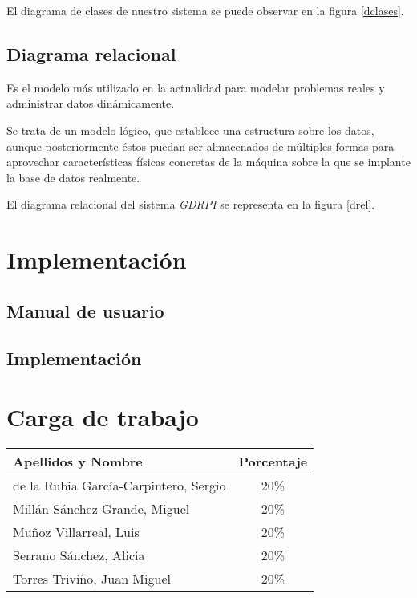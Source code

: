 \documentclass[11pt,a4paper,spanish,twoside]{book}
\begin{document}
El diagrama de clases de nuestro sistema se puede observar en la figura
\ref{dclases}.

\begin{sidewaystable}
\end{sidewaystable}

\section{Diagrama relacional}
Es el modelo más utilizado en la actualidad para modelar problemas reales y 
administrar datos dinámicamente.

Se trata de un modelo lógico, que establece una estructura sobre los datos,
aunque posteriormente éstos puedan ser almacenados de múltiples formas para
aprovechar características físicas concretas de la máquina sobre la que se
implante la base de datos realmente.

El diagrama relacional del sistema \emph{GDRPI} se representa en la figura
\ref{drel}. 

\chapter{Implementación}

\section{Manual de usuario}

\section{Implementación}

\appendix
\chapter{Carga de trabajo}
\begin{center}
  \begin{tabular}{p{10cm}|c}
    \textbf{Apellidos y Nombre} & \textbf{Porcentaje} \\ \hline \hline
    de la Rubia García-Carpintero, Sergio & 20\% \\
    Millán Sánchez-Grande, Miguel         & 20\% \\ 
    Muñoz Villarreal, Luis                & 20\% \\ 
    Serrano Sánchez, Alicia               & 20\% \\ 
    Torres Triviño, Juan Miguel           & 20\% \\
  \end{tabular}
\end{center}
\end{document}
